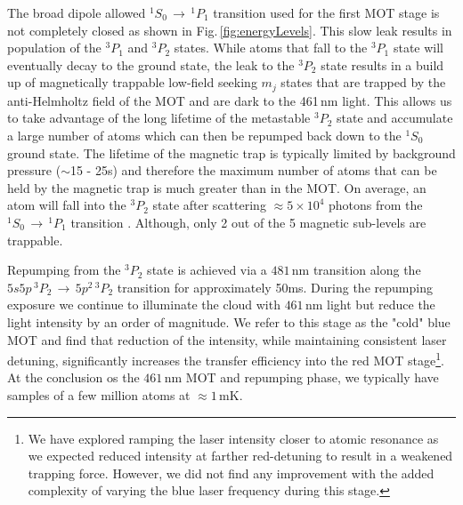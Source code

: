 The broad dipole allowed $^1S_0\,\rightarrow\,^1P_1$ transition used for the first MOT stage is not completely closed as shown in Fig.\,\ref{fig:energyLevels}.
This slow leak results in population of the $^3P_1$ and $^3P_2$ states.
While atoms that fall to the $^3P_1$ state will eventually decay to the ground state, the leak to the $^3P_2$ state results in a build up of magnetically trappable low-field seeking $m_j$ states that are trapped by the anti-Helmholtz field of the MOT and are dark to the 461\,nm light.
This allows us to take advantage of the long lifetime of the metastable $^3P_2$ state and accumulate a large number of atoms which can then be repumped back down to the $^1S_0$ ground state.
The lifetime of the magnetic trap is typically limited by background pressure ($\sim$15 - 25s) and therefore the maximum number of atoms that can be held by the magnetic trap is much greater than in the MOT.
On average, an atom will fall into the $^3P_2$ state after scattering $\approx5\times10^4$ photons from the $^1S_0\,\rightarrow\,^1P_1$ transition \cite{Cooper2018}.
Although, only 2 out of the 5 magnetic sub-levels are trappable.

Repumping from the $^3P_2$ state is achieved via a $481\,$nm transition along the $5s5p\,^3P_2\,\rightarrow\,5p^2\,^3P_2$ transition for approximately 50ms.
During the repumping exposure we continue to illuminate the cloud with $461\,$nm light but reduce the light intensity by an order of magnitude.
We refer to this stage as the "cold" blue MOT and find that reduction of the intensity, while maintaining consistent laser detuning, significantly increases the transfer efficiency into the red MOT stage\footnote{We have explored ramping the laser intensity closer to atomic resonance as we expected reduced intensity at farther red-detuning to result in a weakened trapping force.
However, we did not find any improvement with the added complexity of varying the blue laser frequency during this stage.}.
At the conclusion os the $461\,$nm MOT and repumping phase, we typically have samples of a few million atoms at $\approx1\,$mK.

